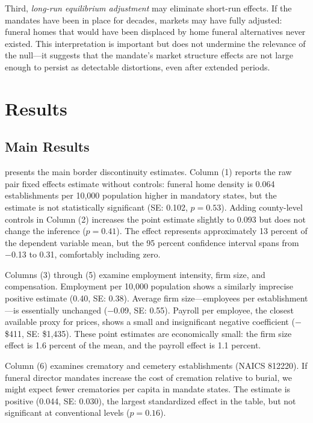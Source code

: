 \documentclass[12pt]{article}
\begin{document}
Third, \textit{long-run equilibrium adjustment} may eliminate short-run effects. If the mandates have been in place for decades, markets may have fully adjusted: funeral homes that would have been displaced by home funeral alternatives never existed. This interpretation is important but does not undermine the relevance of the null---it suggests that the mandate's market structure effects are not large enough to persist as detectable distortions, even after extended periods.


\section{Results}

\subsection{Main Results}



 presents the main border discontinuity estimates. Column (1) reports the raw pair fixed effects estimate without controls: funeral home density is 0.064 establishments per 10,000 population higher in mandatory states, but the estimate is not statistically significant (SE: 0.102, $p = 0.53$). Adding county-level controls in Column (2) increases the point estimate slightly to 0.093 but does not change the inference ($p = 0.41$). The effect represents approximately 13 percent of the dependent variable mean, but the 95 percent confidence interval spans from $-$0.13 to 0.31, comfortably including zero.

Columns (3) through (5) examine employment intensity, firm size, and compensation. Employment per 10,000 population shows a similarly imprecise positive estimate (0.40, SE: 0.38). Average firm size---employees per establishment---is essentially unchanged ($-$0.09, SE: 0.55). Payroll per employee, the closest available proxy for prices, shows a small and insignificant negative coefficient ($-$\$411, SE: \$1,435). These point estimates are economically small: the firm size effect is 1.6 percent of the mean, and the payroll effect is 1.1 percent.

Column (6) examines crematory and cemetery establishments (NAICS 812220). If funeral director mandates increase the cost of cremation relative to burial, we might expect fewer crematories per capita in mandate states. The estimate is positive (0.044, SE: 0.030), the largest standardized effect in the table, but not significant at conventional levels ($p = 0.16$).
\end{document}
